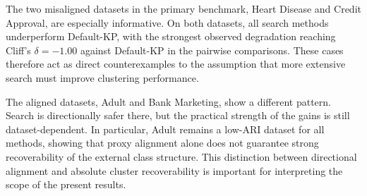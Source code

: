 \documentclass[10pt,lineno]{wlpeerj}
\begin{document}
\begin{table}[t]
\centering
\caption{Real-data evaluation: mean ARI $\pm$ standard deviation over 30 runs. Search methods use 15 evaluations per run; Def.-KP is the no-search baseline. Datasets are grouped by proxy alignment.}
\label{tab:real_results}
\scriptsize
{}
\end{table}

The two misaligned datasets in the primary benchmark, Heart Disease and Credit Approval, are especially informative. On both datasets, all search methods underperform Default-KP, with the strongest observed degradation reaching Cliff's $\delta=-1.00$ against Default-KP in the pairwise comparisons. These cases therefore act as direct counterexamples to the assumption that more extensive search must improve clustering performance.

The aligned datasets, Adult and Bank Marketing, show a different pattern. Search is directionally safer there, but the practical strength of the gains is still dataset-dependent. In particular, Adult remains a low-ARI dataset for all methods, showing that proxy alignment alone does not guarantee strong recoverability of the external class structure. This distinction between directional alignment and absolute cluster recoverability is important for interpreting the scope of the present results.
\end{document}
